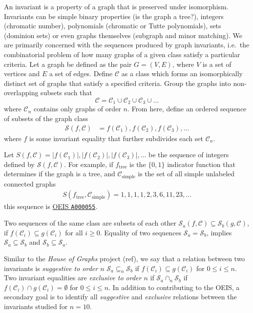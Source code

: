 \documentclass[12pt]{article}
\newcommand{\OEIS}[1]
{\href{https://oeis.org/#1}{OEIS \texttt{#1}}}
\newcommand{\SEQ}{\mathcal{S}}
\newcommand{\CLASS}{\mathcal{C}}
\newcommand{\SIMPLECLASS}{\mathcal{C}_\text{simple}}
\newcommand{\ie}[0]{i.e.\ }
\begin{document}
An invariant is a property of a graph that is preserved under isomorphism. 
Invariants can be simple binary properties (is the graph a tree?), integers (chromatic number), polynomials (chromatic or Tutte polynomials), sets (dominion sets) or even graphs themselves (subgraph and minor matching).
We are primarily concerned with the sequences produced by graph invariants, \ie the combinatorial problem of how many graphs of a given class satisfy a particular criteria.
Let a graph be defined as the pair $G = (V,E)$, where $V$ is a set of vertices and $E$ a set of edges. 
Define $\CLASS$ as a class which forms an isomorphically distinct set of graphs that satisfy a specified criteria.
Group the graphs into non-overlapping subsets such that
\begin{equation}
\CLASS = \CLASS_1 \cup \CLASS_2 \cup \CLASS_3 \cup \ldots
\end{equation}
where $\CLASS_n$ contains only graphs of order $n$.
From here, define an ordered sequence of subsets of the graph class
%
\begin{align}
\SEQ(f, \CLASS) 
&= f(\CLASS_1), f(\CLASS_2), f(\CLASS_3), \ldots
\end{align}
%
where $f$ is some invariant equality that further subdivides each set $\CLASS_n$.

Let 
$S(f, \CLASS) = |f(\CLASS_1)|, |f(\CLASS_2)|, |f(\CLASS_3)|, \ldots$
be the sequence of integers defined by $\SEQ(f, \CLASS)$. For example, if $f_\text{tree}$ is the $\{0,1\}$ indicator function that determines if the graph is a tree, and $\SIMPLECLASS$ is the set of all simple unlabeled connected graphs
%
\begin{align}
S(f_\text{tree}, \SIMPLECLASS) = 1, 1, 1, 1, 2, 3, 6, 11, 23, \ldots
\end{align}
%
this sequence is \OEIS{A000055}.

Two sequences of the same class are subsets of each other $\SEQ_a(f,\CLASS) \subseteq \SEQ_b(g, \CLASS)$, if $f(\CLASS_i) \subseteq g(\CLASS_i)$ for all $i\ge0$. Equality of two sequences $\SEQ_a = \SEQ_b$, implies $\SEQ_a \subseteq \SEQ_b$ and $\SEQ_b \subseteq \SEQ_a$. 

Similar to the \textit{House of Graphs} project (ref), we say that a relation between two invariants is \textit{suggestive to order $n$} $\SEQ_a \subseteq_n \SEQ_b$ if $f(\CLASS_i) \subseteq g(\CLASS_i)$ for $0 \le i \le n$.
Two invariant equalities are \textit{exclusive to order $n$} if $\SEQ_a \cap_n \SEQ_b$ if $f(\CLASS_i) \cap g(\CLASS_i) = \emptyset$ for $0 \le i \le n$.
In addition to contributing to the OEIS, a secondary goal is to identify all \textit{suggestive} and \textit{exclusive} relations between the invariants studied for $n=10$.
\end{document}

